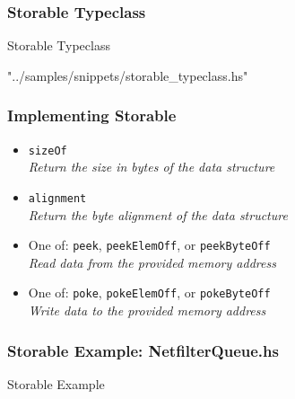 \documentclass{beamer}
\begin{document}
\begin{frame}[fragile]
    \frametitle{Storable Typeclass}
    \begin{exampleblock}{Storable Typeclass}
        \begin{lstinputlisting}[language=Haskell]{"../samples/snippets/storable_typeclass.hs"}
    \end{lstinputlisting}
\end{exampleblock}
\end{frame}
\begin{frame}
    \frametitle{Implementing Storable}
    \begin{itemize}
        \item {{\tt sizeOf} \\
                {\it Return the size in bytes of the data structure}
            }
        \item {{\tt alignment} \\
                {\it Return the byte alignment of the data structure}
            }
        \item {One of: {\tt peek}, {\tt peekElemOff}, or {\tt peekByteOff} \\
                {\it Read data from the provided memory address}
            }
        \item {One of: {\tt poke}, {\tt pokeElemOff}, or {\tt pokeByteOff} \\
                {\it Write data to the provided memory address}
            }
    \end{itemize}
\end{frame}
\begin{frame}[fragile]
    \frametitle{Storable Example: NetfilterQueue.hs}
    \begin{exampleblock}{Storable Example}
    
    \end{exampleblock}
\end{frame}
\end{document}
